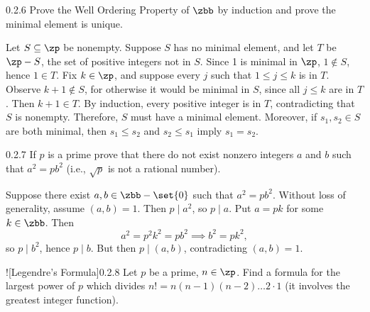 \begin{exercise}{0.2.6}
    Prove the Well Ordering Property of $\zbb$ by induction and prove the minimal element is unique.
\end{exercise}

\begin{sol}
    Let $S \subseteq \zp$ be nonempty.
    Suppose $S$ has no minimal element, and let $T$ be $\zp - S$, the set of positive integers not in $S$.
	Since 1 is minimal in $\zp$, $1 \notin S$, hence $1 \in T$.
	Fix $k \in \zp$, and suppose every $j$ such that $1 \leq j \leq k$ is in $T$.
	Observe $k + 1 \notin S$, for otherwise it would be minimal in $S$, since all $j \leq k$ are in $T$.
	Then $k + 1 \in T$.
	By induction, every positive integer is in $T$, contradicting that $S$ is nonempty.
	Therefore, $S$ must have a minimal element.
    Moreover, if $s_1, s_2 \in S$ are both minimal, then $s_1 \leq s_2$ and $s_2 \leq s_1$ imply $s_1 = s_2$.
\end{sol}

\begin{exercise}{0.2.7}
    If $p$ is a prime prove that there do not exist nonzero integers $a$ and $b$ such that $a^2 = pb^2$ (i.e., $\sqrt{p}$ is not a rational number).
\end{exercise}

\begin{sol}
    Suppose there exist $a, b \in \zbb - \set{0}$ such that $a^2 = pb^2$.
    Without loss of generality, assume $(a, b) = 1$.
    Then $p \mid a^2$, so $p \mid a$.
    Put $a = pk$ for some $k \in \zbb$.
    Then
    \[
        a^2 = p^2k^2 = pb^2 \implies b^2 = pk^2,
    \]
    so $p \mid b^2$, hence $p \mid b$.
    But then $p \mid (a, b)$, contradicting $(a, b) = 1$.
\end{sol}

\begin{exercise}![Legendre's Formula]{0.2.8}
    Let $p$ be a prime, $n \in \zp$.
	Find a formula for the largest power of $p$ which divides $n! = n(n - 1)(n - 2) \ldots 2 \cdot 1$ (it involves the greatest integer function).

\end{exercise}

